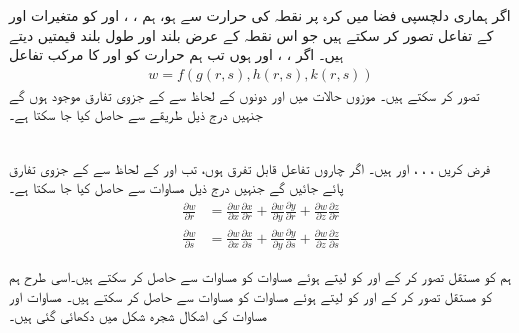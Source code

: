 اگر ہماری دلچسپی  فضا میں  کرہ  پر نقطہ   کی   حرارت سے  ہو، ہم  ،  ، اور  کو  متغیرات  اور  کے تفاعل تصور کر سکتے ہیں جو  اس نقطہ کے عرض بلند اور  طول بلند قیمتیں دیتے ہیں۔ اگر ،  ، اور  ہوں  تب ہم حرارت کو  اور  کا  مرکب تفاعل
\begin{align*}
w=f(g(r,s),h(r,s),k(r,s))
\end{align*}
 تصور کر سکتے ہیں۔ موزوں حالات میں   اور  دونوں کے لحاظ سے  کے جزوی تفارق موجود ہوں گے جنہیں درج ذیل طریقے  سے حاصل کیا جا سکتا ہے۔


\\
فرض کریں ، ، ،  اور  ہیں۔ اگر چاروں تفاعل قابل تفرق ہوں، تب  اور  کے لحاظ سے  کے جزوی تفارق    پائے جائیں گے جنہیں درج ذیل مساوات سے حاصل کیا جا سکتا ہے۔
\begin{align}
\frac{\partial w}{\partial r}&=\frac{\partial w}{\partial x}\frac{\partial x}{\partial r}+\frac{\partial w}{\partial y}\frac{\partial y}{\partial r}+\frac{\partial w}{\partial z}\frac{\partial z}{\partial r}\label{مساوات_کثیرالمتغیر_دو_غیر_تابع_تین_درمیانے_متغیر_الف}\\
\frac{\partial w}{\partial s}&=\frac{\partial w}{\partial x}\frac{\partial x}{\partial s}+\frac{\partial w}{\partial y}\frac{\partial y}{\partial s}+\frac{\partial w}{\partial z}\frac{\partial z}{\partial s}\label{مساوات_کثیرالمتغیر_دو_غیر_تابع_تین_درمیانے_متغیر_ب}
\end{align}

 ہم  کو مستقل  تصور کر کے  اور   کو  لیتے  ہوئے مساوات  کو   مساوات  سے   حاصل کر سکتے ہیں۔اسی طرح   ہم  کو مستقل  تصور کر کے  اور   کو لیتے  ہوئے مساوات  کو   مساوات  سے   حاصل کر سکتے ہیں۔ مساوات  اور مساوات  کی  اشکال شجرہ  شکل  میں دکھائی گئی ہیں۔

